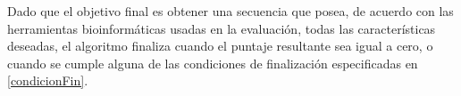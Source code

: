

Dado que el objetivo final es obtener una secuencia que posea, de acuerdo con las herramientas bioinformáticas usadas en la evaluación, todas las características deseadas, 
el algoritmo finaliza cuando el puntaje resultante sea igual a cero, o cuando se cumple alguna de las condiciones de finalización especificadas en \ref{condicionFin}. 






